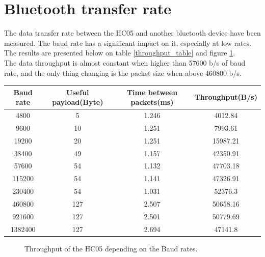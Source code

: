 \documentclass[11pt]{article}
\begin{document}
\section{Bluetooth transfer rate}
The data transfer rate between the HC05 and another bluetooth device have been measured. The baud rate has a significant impact on it, especially at low rates. The results are presented below on table \ref{throughput_table} and figure \ref{throughput_fig}.\\
The data throughput is almost constant when higher than 57600 b/s of baud rate, and the only thing changing is the packet size when above 460800 b/s.
\begin{center}
\label{throughput_table}
\begin{tabular}{|c|c|c|c|}
\hline
Baud rate & Useful payload(Byte) & Time between packets(ms) & Throughput(B/s)\\
\hline
4800 & 5 & 1.246 & 4012.84 \\
\hline
9600 & 10 & 1.251 & 7993.61 \\
\hline
19200 & 20 & 1.251 & 15987.21 \\
\hline
38400 & 49 & 1.157 & 42350.91 \\
\hline
57600 & 54 & 1.132 & 47703.18 \\
\hline
115200 & 54 & 1.141 & 47326.91 \\
\hline
230400 & 54 & 1.031 & 52376.3 \\
\hline
460800 & 127 & 2.507 & 50658.16 \\
\hline
921600 & 127 & 2.501 & 50779.69 \\
\hline
1382400 & 127 & 2.694 & 47141.8\\
\hline
\end{tabular}
\end{center}
\begin{figure}[H]
        \center
        \caption{Throughput of the HC05 depending on the Baud rates.}
        \label{throughput_fig}
\end{figure}
\end{document}

